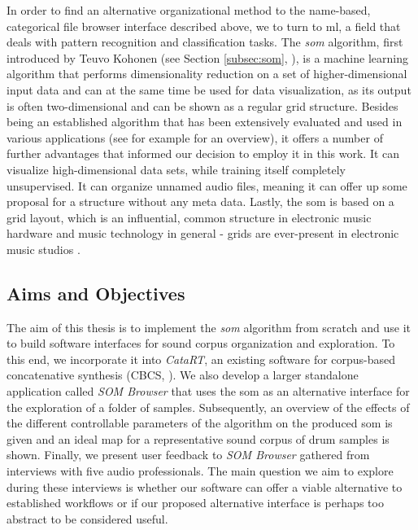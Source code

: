 \smallskip

In order to find an alternative organizational method to the name-based,
categorical file browser interface described above, we to turn to \gls{ml},
a field that deals with pattern recognition and classification tasks. The
\textit{\gls{som}} algorithm, first introduced by Teuvo Kohonen (see Section
\ref{subsec:som}, \citet{kohonen1990}), is a machine learning algorithm that
performs dimensionality reduction on a set of higher-dimensional input data and
can at the same time be used for data visualization, as its output is often
two-dimensional and can be shown as a regular grid structure. Besides being an
established algorithm that has been extensively evaluated and used in various
applications (see for example \citet[p.1476]{kohonen1990} for an overview), it
offers a number of further advantages that informed our decision to employ it
in this work. It can visualize high-dimensional data sets, while training itself
completely unsupervised. It can organize unnamed audio files, meaning it can
offer up some proposal for a structure without any meta data. Lastly, the
\gls{som} is based on a grid layout, which is an influential, common structure
in electronic music hardware and music technology in general - grids are
ever-present in electronic music studios \citep{adeney2009}.


\subsection{Aims and Objectives}
\label{subsec:aims}

The aim of this thesis is to implement the \textit{\gls{som}} algorithm from
scratch and use it to build software interfaces for sound corpus organization
and exploration. To this end, we incorporate it into \textit{CataRT}, an
existing software for corpus-based concatenative synthesis (CBCS,
\citet{schwarz2006}). We also develop a larger standalone application called
\textit{SOM Browser} that uses the \gls{som} as an alternative interface for the
exploration of a folder of samples. Subsequently, an overview of the
effects of the different controllable parameters of the algorithm on the
produced \gls{som} is given and an ideal map for a representative sound corpus
of drum samples is shown. Finally, we present user feedback to
\textit{SOM Browser} gathered from interviews with five audio professionals.
The main question we aim to explore during these interviews is whether our
software can offer a viable alternative to established workflows or if our
proposed alternative interface is perhaps too abstract to be considered useful.

